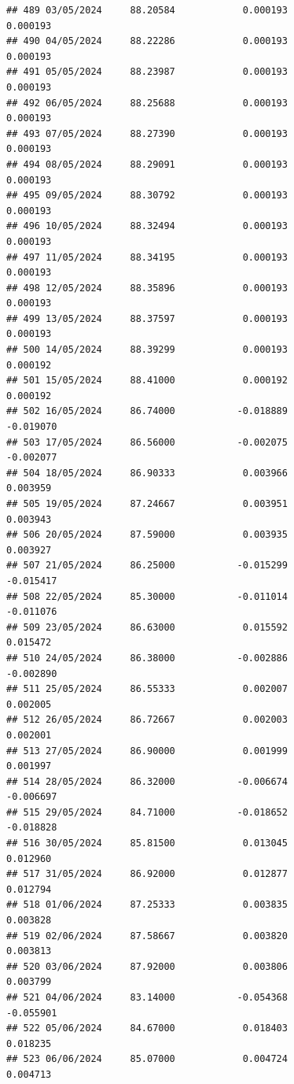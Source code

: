 \documentclass[
]{article}
\begin{document}
\begin{verbatim}
## 489 03/05/2024     88.20584            0.000193                0.000193
## 490 04/05/2024     88.22286            0.000193                0.000193
## 491 05/05/2024     88.23987            0.000193                0.000193
## 492 06/05/2024     88.25688            0.000193                0.000193
## 493 07/05/2024     88.27390            0.000193                0.000193
## 494 08/05/2024     88.29091            0.000193                0.000193
## 495 09/05/2024     88.30792            0.000193                0.000193
## 496 10/05/2024     88.32494            0.000193                0.000193
## 497 11/05/2024     88.34195            0.000193                0.000193
## 498 12/05/2024     88.35896            0.000193                0.000193
## 499 13/05/2024     88.37597            0.000193                0.000193
## 500 14/05/2024     88.39299            0.000193                0.000192
## 501 15/05/2024     88.41000            0.000192                0.000192
## 502 16/05/2024     86.74000           -0.018889               -0.019070
## 503 17/05/2024     86.56000           -0.002075               -0.002077
## 504 18/05/2024     86.90333            0.003966                0.003959
## 505 19/05/2024     87.24667            0.003951                0.003943
## 506 20/05/2024     87.59000            0.003935                0.003927
## 507 21/05/2024     86.25000           -0.015299               -0.015417
## 508 22/05/2024     85.30000           -0.011014               -0.011076
## 509 23/05/2024     86.63000            0.015592                0.015472
## 510 24/05/2024     86.38000           -0.002886               -0.002890
## 511 25/05/2024     86.55333            0.002007                0.002005
## 512 26/05/2024     86.72667            0.002003                0.002001
## 513 27/05/2024     86.90000            0.001999                0.001997
## 514 28/05/2024     86.32000           -0.006674               -0.006697
## 515 29/05/2024     84.71000           -0.018652               -0.018828
## 516 30/05/2024     85.81500            0.013045                0.012960
## 517 31/05/2024     86.92000            0.012877                0.012794
## 518 01/06/2024     87.25333            0.003835                0.003828
## 519 02/06/2024     87.58667            0.003820                0.003813
## 520 03/06/2024     87.92000            0.003806                0.003799
## 521 04/06/2024     83.14000           -0.054368               -0.055901
## 522 05/06/2024     84.67000            0.018403                0.018235
## 523 06/06/2024     85.07000            0.004724                0.004713

\end{verbatim}
\end{document}
